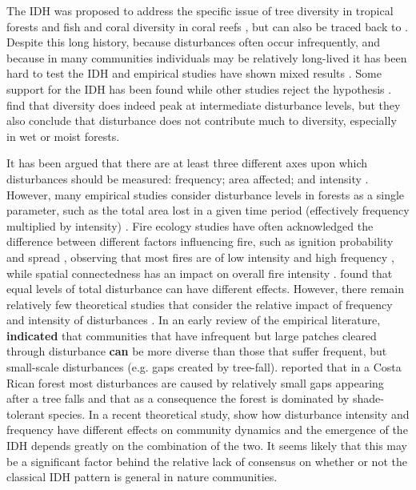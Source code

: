 The IDH was proposed to address the specific issue of tree diversity in tropical forests and fish and coral diversity in coral reefs \citep{connell1978diversity}, but can also be traced back to \cite{grime1973competitive}. Despite this long history, because disturbances often occur infrequently, and because in many communities individuals may be relatively long-lived it has been hard to test the IDH and empirical studies have shown mixed results \citep[see review in ][]{mackey2001diversity}. Some support for the IDH has been found \citep[e.g.][]{biswas2010disturbance,molino2001tree,rogers1993hurricanes} while other studies reject the hypothesis \citep[e.g.][]{hubbell1999light,huxham2000field}. \cite{bongers2009intermediate} find that diversity does indeed peak at intermediate disturbance levels, but they also conclude that disturbance does not contribute much to diversity, especially in wet or moist forests.

It has been argued that there are at least three different axes upon which disturbances should be measured: frequency; area affected; and intensity \citep{malanson1984intensity,miller1982community,sousa1984role}.  However, many empirical studies consider disturbance levels in forests as a single parameter, such as the total area lost in a given time period (effectively frequency multiplied by intensity) \citep[e.g.][]{molino2001tree,nakagawa2000impact,peterson1997tornado}. Fire ecology studies have often acknowledged the difference between different factors influencing fire, such as ignition probability and spread \citep[e.g.][]{kilgore1979fire,turner1994landscape}, observing that most fires are of low intensity and high frequency \citep{kilgore1979fire}, while spatial connectedness has an impact on overall fire intensity \citep{turner1994landscape}. \cite{svensson2009equal} found that equal levels of total disturbance can have different effects. However, there remain relatively few theoretical studies that consider the relative impact of frequency and intensity of disturbances \citep[but see ][]{miller2011frequency}. In an early review of the empirical literature, \cite{denslow1980patterns} \textbf{indicated} that communities that have infrequent but large patches cleared through disturbance \textbf{can} be more diverse than those that suffer frequent, but small-scale disturbances (e.g. gaps created by tree-fall). \cite{hartshorn1978treefalls} reported that in a Costa Rican forest most disturbances are caused by relatively small gaps appearing after a tree falls and that as a consequence the forest is dominated by shade-tolerant species. In a recent theoretical study, \cite{miller2011frequency} show how disturbance intensity and frequency have different effects on community dynamics and the emergence of the IDH depends greatly on the combination of the two. It seems likely that this may be a significant factor behind the relative lack of consensus on whether or not the classical IDH pattern is general in nature communities.

